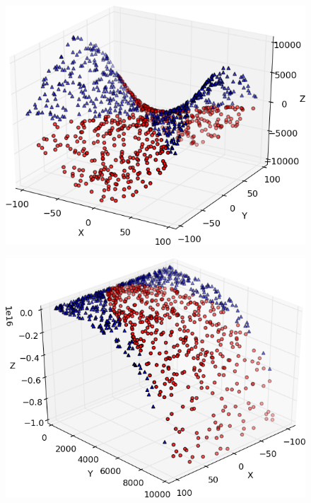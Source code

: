 \begin{enumerate}
\begin{itemize}
\begin{figure}
\centering
\begin{minipage}{.5\textwidth}
  \centering
  \includegraphics[width=\linewidth]{normal-1000-3.png}
  \label{fig:3Dplot}
\end{minipage}%
\begin{minipage}{.5\textwidth}
  \centering
  \includegraphics[width=\linewidth]{phi-1000-3.png}
  \label{fig:Contourplot}
\end{minipage}
\end{figure}
\end{itemize}

\end{enumerate}


